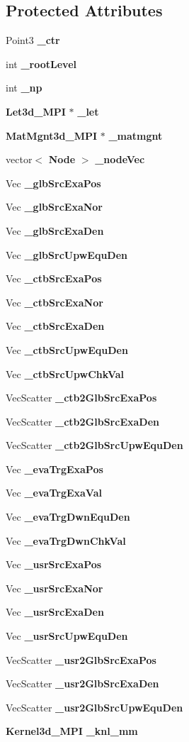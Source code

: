 \subsection*{Protected Attributes}
\begin{CompactItemize}
\item 
Point3 {\bf \_\-ctr}
\item 
int {\bf \_\-root\-Level}
\item 
int {\bf \_\-np}
\item 
{\bf Let3d\_\-MPI} $\ast$ {\bf \_\-let}
\item 
{\bf Mat\-Mgnt3d\_\-MPI} $\ast$ {\bf \_\-matmgnt}
\item 
vector$<$ {\bf Node} $>$ {\bf \_\-node\-Vec}
\item 
Vec {\bf \_\-glb\-Src\-Exa\-Pos}
\item 
Vec {\bf \_\-glb\-Src\-Exa\-Nor}
\item 
Vec {\bf \_\-glb\-Src\-Exa\-Den}
\item 
Vec {\bf \_\-glb\-Src\-Upw\-Equ\-Den}
\item 
Vec {\bf \_\-ctb\-Src\-Exa\-Pos}
\item 
Vec {\bf \_\-ctb\-Src\-Exa\-Nor}
\item 
Vec {\bf \_\-ctb\-Src\-Exa\-Den}
\item 
Vec {\bf \_\-ctb\-Src\-Upw\-Equ\-Den}
\item 
Vec {\bf \_\-ctb\-Src\-Upw\-Chk\-Val}
\item 
Vec\-Scatter {\bf \_\-ctb2Glb\-Src\-Exa\-Pos}
\item 
Vec\-Scatter {\bf \_\-ctb2Glb\-Src\-Exa\-Den}
\item 
Vec\-Scatter {\bf \_\-ctb2Glb\-Src\-Upw\-Equ\-Den}
\item 
Vec {\bf \_\-eva\-Trg\-Exa\-Pos}
\item 
Vec {\bf \_\-eva\-Trg\-Exa\-Val}
\item 
Vec {\bf \_\-eva\-Trg\-Dwn\-Equ\-Den}
\item 
Vec {\bf \_\-eva\-Trg\-Dwn\-Chk\-Val}
\item 
Vec {\bf \_\-usr\-Src\-Exa\-Pos}
\item 
Vec {\bf \_\-usr\-Src\-Exa\-Nor}
\item 
Vec {\bf \_\-usr\-Src\-Exa\-Den}
\item 
Vec {\bf \_\-usr\-Src\-Upw\-Equ\-Den}
\item 
Vec\-Scatter {\bf \_\-usr2Glb\-Src\-Exa\-Pos}
\item 
Vec\-Scatter {\bf \_\-usr2Glb\-Src\-Exa\-Den}
\item 
Vec\-Scatter {\bf \_\-usr2Glb\-Src\-Upw\-Equ\-Den}
\item 
{\bf Kernel3d\_\-MPI} {\bf \_\-knl\_\-mm}
\end{CompactItemize}

